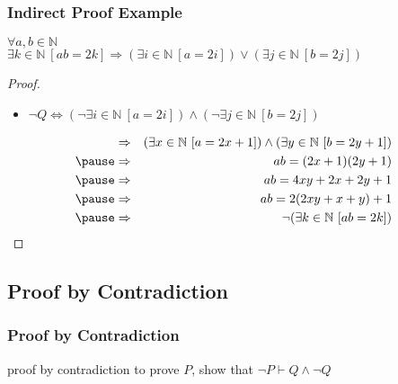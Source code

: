\documentclass[dvipsnames]{beamer}
\begin{document}
\begin{frame}
  \frametitle{Indirect Proof Example}

  \begin{theorem}
    $\forall a,b \in \mathbb{N}$\\
      $\exists k \in \mathbb{N}~[ab=2k] \Rightarrow
        (\exists i \in \mathbb{N}~[a=2i]) \vee
        (\exists j \in \mathbb{N}~[b=2j])$
  \end{theorem}

  \pause
  \begin{proof}
    \begin{itemize}
      \item $\neg Q \Leftrightarrow (\neg \exists i \in \mathbb{N}~[a=2i])
                          \wedge (\neg \exists j \in \mathbb{N}~[b=2j])$
    \end{itemize}

    \pause
    \vspace{-24pt}
    \begin{eqnarray*}
      & \Rightarrow & (\exists x \in \mathbb{N}~[a=2x+1])
               \wedge (\exists y \in \mathbb{N}~[b=2y+1])\\\pause
      & \Rightarrow & ab=(2x+1)(2y+1)\\\pause
      & \Rightarrow & ab=4xy+2x+2y+1\\\pause
      & \Rightarrow & ab=2(2xy+x+y)+1\\\pause
      & \Rightarrow & \neg (\exists k \in \mathbb{N}~[ab=2k])
    \end{eqnarray*}
  \end{proof}
\end{frame}

\subsection{Proof by Contradiction}

\begin{frame}
  \frametitle{Proof by Contradiction}

  \begin{block}{proof by contradiction}
    to prove $P$, show that $\neg P \vdash Q \wedge \neg Q$
  \end{block}
\end{frame}
\end{document}
